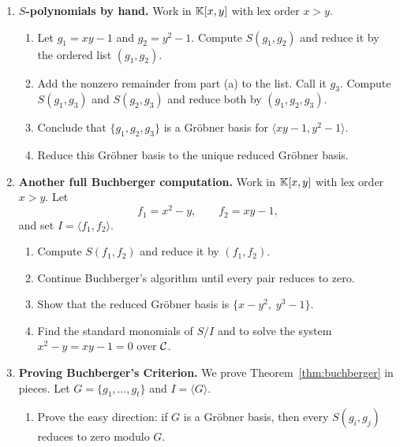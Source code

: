 \documentclass[Notebook.tex]{subfiles}
\begin{document}
\hrulefill

\begin{enumerate}[leftmargin=*, resume=problems]

\item \textbf{$S$-polynomials by hand.} Work in $\mathbb K[x,y]$ with lex order $x>y$.
\begin{enumerate}[label=(\alph*),ref=\theenumi\alph*]
    \item Let $g_1=xy-1$ and $g_2=y^2-1$. Compute $S(g_1,g_2)$ and reduce it by the ordered list $(g_1,g_2)$.
    
    \item Add the nonzero remainder from part (a) to the list. Call it $g_3$. Compute $S(g_1,g_3)$ and $S(g_2,g_3)$ and reduce both by $(g_1,g_2,g_3)$.
    
    \item Conclude that $\{g_1,g_2,g_3\}$ is a Gr\"obner basis for $\langle xy-1,y^2-1\rangle$.
    
    \item Reduce this Gr\"obner basis to the unique reduced Gr\"obner basis.
\end{enumerate}

\item \textbf{Another full Buchberger computation.} Work in $\mathbb K[x,y]$ with lex order $x>y$. Let
\[
    f_1=x^2-y,\qquad f_2=xy-1,
\]
and set $I=\langle f_1,f_2\rangle$.
\begin{enumerate}[label=(\alph*),ref=\theenumi\alph*]
    \item Compute $S(f_1,f_2)$ and reduce it by $(f_1,f_2)$.
    
    \item Continue Buchberger's algorithm until every pair reduces to zero.
    
    \item Show that the reduced Gr\"obner basis is $ \{x-y^2,\; y^3-1\}$.

    \item Find the standard monomials of $S/I$ and to solve the system $x^2-y=xy-1=0$ over $\mathcal{C}$.
\end{enumerate}

\item \textbf{Proving Buchberger's Criterion.} We prove Theorem~\ref{thm:buchberger} in pieces. Let $G=\{g_1,\ldots,g_t\}$ and $I=\langle G\rangle$.
\begin{enumerate}[label=(\alph*),ref=\theenumi\alph*]
    \item Prove the easy direction: if $G$ is a Gr\"obner basis, then every $S(g_i,g_j)$ reduces to zero modulo $G$.
    

\end{enumerate}
\end{enumerate}
\end{document}
